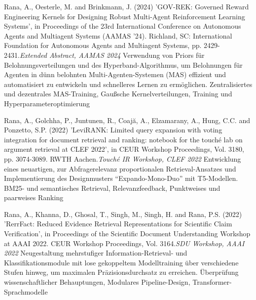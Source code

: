 \begin{projects}
	\project
	{Rana, A., Oesterle, M. and Brinkmann, J. (2024) 'GOV-REK: Governed Reward Engineering Kernels for Designing Robust Multi-Agent Reinforcement Learning Systems', in Proceedings of the 23rd International Conference on Autonomous Agents and Multiagent Systems (AAMAS '24). Richland, SC: International Foundation for Autonomous Agents and Multiagent Systems, pp. 2429-2431.}{\textit{Extended Abstract, AAMAS 2024}}
	{
	}
	{Verwendung von Priors für Belohnungsverteilungen und des Hyperband-Algorithmus, um Belohnungen für Agenten in dünn belohnten Multi-Agenten-Systemen (MAS) effizient und automatisiert zu entwickeln und schnelleres Lernen zu ermöglichen.}
	{Zentralisiertes und dezentrales MAS-Training, Gaußsche Kernelverteilungen, Training und Hyperparameteroptimierung}

	\project
	{Rana, A., Golchha, P., Juntunen, R., Coajă, A., Elzamarany, A., Hung, C.C. and Ponzetto, S.P. (2022) 'LeviRANK: Limited query expansion with voting integration for document retrieval and ranking: notebook for the touché lab on argument retrieval at CLEF 2022', in CEUR Workshop Proceedings, Vol. 3180, pp. 3074-3089. RWTH Aachen.}{\textit{Touch\'e IR Workshop, CLEF 2022}}
	{
	}
	{Entwicklung eines neuartigen, zur Abfragerelevanz proportionalen Retrieval-Ansatzes und Implementierung des Designmusters ``Expando-Mono-Duo'' mit T5-Modellen.}
	{BM25- und semantisches Retrieval, Relevanzfeedback, Punktweises und paarweises Ranking}

	\project
	{Rana, A., Khanna, D., Ghosal, T., Singh, M., Singh, H. and Rana, P.S. (2022) 'RerrFact: Reduced Evidence Retrieval Representations for Scientific Claim Verification', in Proceedings of the Scientific Document Understanding Workshop at AAAI 2022. CEUR Workshop Proceedings, Vol. 3164.}{\textit{SDU Workshop, AAAI 2022}}
	{
	}
	{Neugestaltung mehrstufiger Information-Retrieval- und Klassifikationsmodule mit lose gekoppeltem Modelltraining über verschiedene Stufen hinweg, um maximalen Präzisionsdurchsatz zu erreichen.}
	{Überprüfung wissenschaftlicher Behauptungen, Modulares Pipeline-Design, Transformer-Sprachmodelle}


\end{projects}
